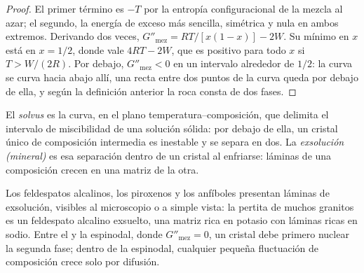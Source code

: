 \begin{proof}
El primer término es $-T$ por la entropía configuracional de la mezcla al azar;
el segundo, la energía de exceso más sencilla, simétrica y nula en ambos extremos.
Derivando dos veces, $G''_{\text{mez}} = RT/[x(1 - x)] - 2W$. Su mínimo
en $x$ está en $x = 1/2$, donde vale $4RT - 2W$, que es positivo para
todo $x$ si $T > W/(2R)$. Por debajo, $G''_{\text{mez}} < 0$ en un intervalo
alrededor de $1/2$: la curva se curva hacia abajo allí, una recta entre dos puntos
de la curva queda por debajo de ella, y según la definición anterior la roca consta de
dos fases.
\end{proof}

\begin{definition}\label{def:b3:petrological-thermodynamics:solvus}
El \emph{solvus} es la curva, en el plano temperatura--composición,
que delimita el intervalo de miscibilidad de una solución sólida: por debajo de ella, un
cristal único de composición intermedia es inestable y se separa en dos.
La \emph{exsolución (mineral)} es esa separación
dentro de un cristal al enfriarse: láminas de una composición crecen en una matriz de la
otra.
\end{definition}

Los feldespatos alcalinos, los piroxenos y los anfíboles presentan láminas de exsolución,
visibles al microscopio o a simple vista: la pertita de muchos granitos es
un feldespato alcalino exsuelto, una matriz rica en potasio con láminas ricas en
sodio. Entre el  y la espinodal, donde $G''_{\text{mez}} = 0$,
un cristal debe primero nuclear la segunda fase; dentro de la espinodal, cualquier pequeña
fluctuación de composición crece solo por difusión.

